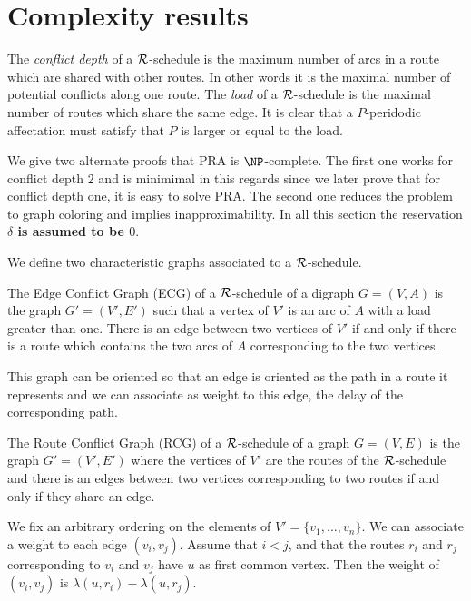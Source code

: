 \documentclass{article}
\newcommand\rschedule{$\cal R$-schedule\xspace}
\begin{document}
\section{Complexity results}


The \emph{conflict depth} of a $\cal R$-schedule is the maximum number of arcs in a route which are 
shared with other routes. In other words it is the maximal number of potential conflicts along one route. 
The \emph{load} of a $\cal R$-schedule is the maximal number of routes which share the same edge.
It is clear that a $P$-peridodic affectation must satisfy that $P$ is larger or equal to the load.

We give two alternate proofs that PRA is $\NP$-complete.
The first one works for conflict depth $2$ and is minimimal in this regards since we later prove that for conflict depth one,
it is easy to solve PRA. The second one reduces the problem to graph coloring and implies inapproximability. 
In all this section the reservation \textbf{$\delta$ is assumed to be $0$}.


We define two characteristic graphs associated to a $\cal R$-schedule.

\begin{definition}
  The Edge Conflict Graph (ECG) of a \rschedule of a digraph $G=(V,A)$ is the graph $G'=(V',E')$ such that 
  a vertex of $V'$ is an arc of $A$ with a load greater than one. There is an edge between two vertices of $V'$
  if and only if there is a route which contains the two arcs of $A$ corresponding to the two vertices.
  
  This graph can be oriented so that an edge is oriented as the path in a route it represents and
  we can associate as weight to this edge, the delay of the corresponding path.
\end{definition}


\begin{definition}
The Route Conflict Graph (RCG) of a \rschedule of a graph $G=(V,E)$ is the graph $G'=(V',E')$ where 
the vertices of $V'$ are the routes of the  \rschedule and there is an edges between two vertices
corresponding to two routes if and only if they share an edge.

We fix an arbitrary ordering on the elements of $V'=\{v_1,\dots,v_n\}$.
We can associate a weight to each edge $(v_i,v_j)$. Assume that $i < j$, 
and that the routes $r_i$ and $r_j$ corresponding to $v_i$ and $v_j$ have $u$ as first common vertex.
Then the weight of $(v_i,v_j)$ is $\lambda(u,r_i) - \lambda(u,r_j)$.
\end{definition}
\end{document}
